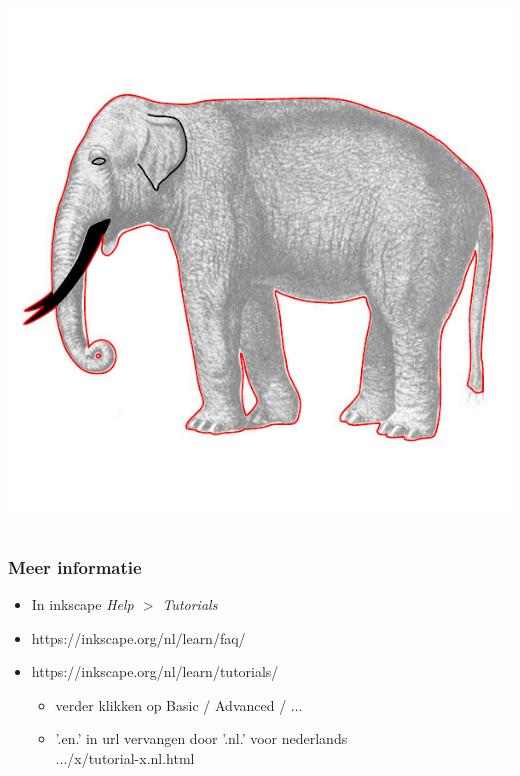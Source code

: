 \documentclass[t]{beamer}
\begin{document}
\begin{frame}
{\begin{center}
				\includegraphics[height=0.8\textheight]{fig/bitmap_overtrekken}
			\end{center}
		}
	\end{frame}
	\section*{}
	\begin{frame}
		\frametitle{Meer informatie}
		\begin{itemize}
			\item In inkscape \emph{Help $>$ Tutorials}
			\item https://inkscape.org/nl/learn/faq/
			\item https://inkscape.org/nl/learn/tutorials/
			\begin{itemize}
				\item verder klikken op Basic / Advanced / ...
				\item '.en.' in url vervangen door '.nl.' voor nederlands\\ \qquad .../x/tutorial-x.nl.html 
			\end{itemize}
		\end{itemize}
	\end{frame}
\end{document}
